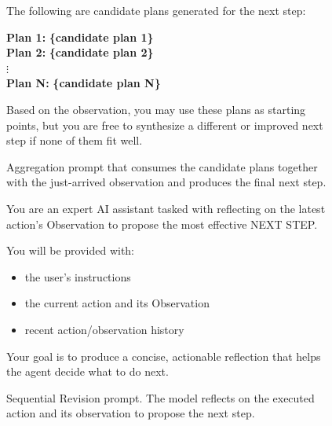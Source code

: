\begin{figure}[H]
\begin{tcolorbox}[colback=gray!5, colframe=black!60, title=Aggregation prompt, fontupper=\small, width=\linewidth]
The following are candidate plans generated for the next step:

\textbf{Plan 1:} \textbf{\{candidate plan 1\}} \\[2pt]
\textbf{Plan 2:} \textbf{\{candidate plan 2\}} \\[2pt]
$\vdots$ \\[2pt]
\textbf{Plan N:} \textbf{\{candidate plan N\}}

Based on the observation, you may use these plans as starting points, but you are free to synthesize a different or improved next step if none of them fit well.
\end{tcolorbox}
\caption{Aggregation prompt that consumes the candidate plans together with the just-arrived observation and produces the final next step.}
\label{fig:prompt_aggregation}
\end{figure}

\begin{figure}[H]
\begin{tcolorbox}[colback=gray!5, colframe=black!60, title=Sequential Revision, fontupper=\small, width=\linewidth]
You are an expert AI assistant tasked with reflecting on the latest action's Observation to propose the most effective NEXT STEP.

You will be provided with:
\begin{itemize}
\item the user's instructions
\item the current action and its Observation
\item recent action/observation history
\end{itemize}
Your goal is to produce a concise, actionable reflection that helps the agent decide what to do next.
\end{tcolorbox}
\caption{Sequential Revision prompt. The model reflects on the executed action and its observation to propose the next step.}
\label{fig:prompt_seqrev}
\end{figure}

